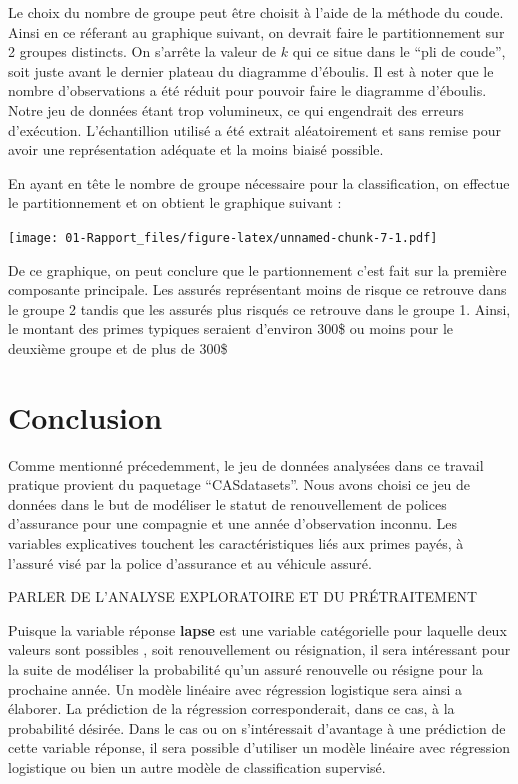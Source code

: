 \documentclass[
]{article}
\begin{document}
Le choix du nombre de groupe peut être choisit à l'aide de la méthode du
coude. Ainsi en ce réferant au graphique suivant, on devrait faire le
partitionnement sur 2 groupes distincts. On s'arrête la valeur de \(k\)
qui ce situe dans le ``pli de coude'', soit juste avant le dernier
plateau du diagramme d'éboulis. Il est à noter que le nombre
d'observations a été réduit pour pouvoir faire le diagramme d'éboulis.
Notre jeu de données étant trop volumineux, ce qui engendrait des
erreurs d'exécution. L'échantillion utilisé a été extrait aléatoirement
et sans remise pour avoir une représentation adéquate et la moins biaisé
possible.

En ayant en tête le nombre de groupe nécessaire pour la classification,
on effectue le partitionnement et on obtient le graphique suivant :

\texttt{[image: 01-Rapport\_files/figure-latex/unnamed-chunk-7-1.pdf]}

De ce graphique, on peut conclure que le partionnement c'est fait sur la
première composante principale. Les assurés représentant moins de risque
ce retrouve dans le groupe 2 tandis que les assurés plus risqués ce
retrouve dans le groupe 1. Ainsi, le montant des primes typiques
seraient d'environ 300\$ ou moins pour le deuxième groupe et de plus de
300\$

\newpage

\hypertarget{conclusion}{%
\section{Conclusion}\label{conclusion}}

Comme mentionné précedemment, le jeu de données analysées dans ce
travail pratique provient du paquetage ``CASdatasets''. Nous avons
choisi ce jeu de données dans le but de modéliser le statut de
renouvellement de polices d'assurance pour une compagnie et une année
d'observation inconnu. Les variables explicatives touchent les
caractéristiques liés aux primes payés, à l'assuré visé par la police
d'assurance et au véhicule assuré.

PARLER DE L'ANALYSE EXPLORATOIRE ET DU PRÉTRAITEMENT

Puisque la variable réponse \textbf{lapse} est une variable catégorielle
pour laquelle deux valeurs sont possibles , soit renouvellement ou
résignation, il sera intéressant pour la suite de modéliser la
probabilité qu'un assuré renouvelle ou résigne pour la prochaine année.
Un modèle linéaire avec régression logistique sera ainsi a élaborer. La
prédiction de la régression corresponderait, dans ce cas, à la
probabilité désirée. Dans le cas ou on s'intéressait d'avantage à une
prédiction de cette variable réponse, il sera possible d'utiliser un
modèle linéaire avec régression logistique ou bien un autre modèle de
classification supervisé.
\end{document}
